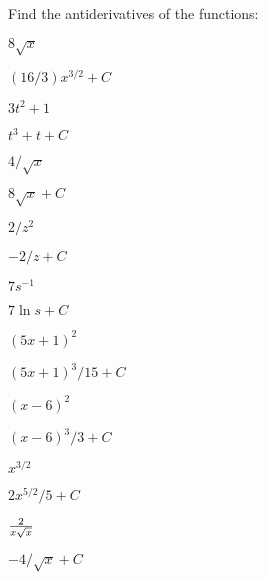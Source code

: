 \begin{mainTheorem}
\begin{exercises}

Find the antiderivatives of the functions:

\twocol

\begin{exercise} $8\sqrt{x}$
\begin{answer} $(16/3)x^{3/2}+C$
\end{answer}\end{exercise}

\begin{exercise} $3t^2+1$
\begin{answer} $t^3+t+C$
\end{answer}\end{exercise}

\begin{exercise} $4/\sqrt{x}$
\begin{answer} $8\sqrt{x}+C$
\end{answer}\end{exercise}

\begin{exercise} $2/z^2$
\begin{answer} $-2/z+C$
\end{answer}\end{exercise}

\iflatetranscendentals
\else
\begin{exercise} $7s^{-1}$
\begin{answer} $7\ln s+C$
\end{answer}\end{exercise}
\fi

\begin{exercise} $(5x+1)^2$
\begin{answer} $(5x+1)^3/15+C$
\end{answer}\end{exercise}

\begin{exercise} $(x-6)^2$
\begin{answer} $(x-6)^3/3+C$
\end{answer}\end{exercise}

\begin{exercise} $x^{3/2}$
\begin{answer} $2x^{5/2}/5+C$
\end{answer}\end{exercise}

\begin{exercise} ${2\over x\sqrt x}$
\begin{answer} $-4/\sqrt{x}+C$
\end{answer}\end{exercise}


\end{exercises}
\end{mainTheorem}
